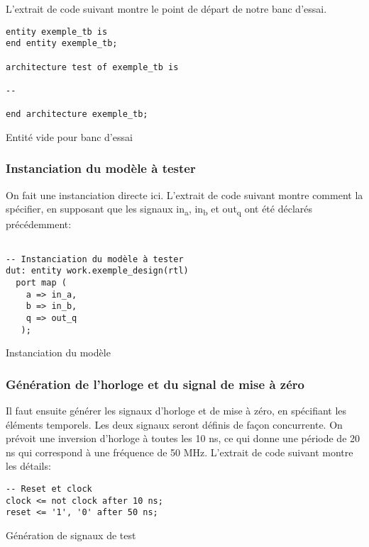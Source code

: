 \documentclass[11pt]{article}
\begin{document}
L'extrait de code suivant montre le point de départ de notre banc
d'essai.

\begin{listing}[htbp]
\begin{verbatim}
entity exemple_tb is
end entity exemple_tb;

architecture test of exemple_tb is

--

end architecture exemple_tb;
\end{verbatim}
\caption{Entité vide pour banc d'essai}
\end{listing}

\subsubsection{Instanciation du modèle à tester}
\label{sec:org7532ff5}

On fait une instanciation directe ici. L'extrait de code suivant
montre comment la spécifier, en supposant que les signaux in\textsubscript{a}, in\textsubscript{b}
et out\textsubscript{q} ont été déclarés précédemment:

\begin{listing}[htbp]
\begin{verbatim}

-- Instanciation du modèle à tester 
dut: entity work.exemple_design(rtl)
  port map (
    a => in_a,
    b => in_b,
    q => out_q
   );

\end{verbatim}
\caption{Instanciation du modèle}
\end{listing}

\subsubsection{Génération de l'horloge et du signal de mise à zéro}
\label{sec:orgca83bb9}

Il faut ensuite générer les signaux d'horloge et de mise à zéro, en
spécifiant les éléments temporels. Les deux signaux seront définis de
façon concurrente. On prévoit une inversion d'horloge à toutes les 10
ns, ce qui donne une période de 20 ns qui correspond à une fréquence
de 50 MHz. L'extrait de code suivant montre les détails:

\begin{listing}[htbp]
\begin{verbatim}
-- Reset et clock
clock <= not clock after 10 ns;
reset <= '1', '0' after 50 ns;
\end{verbatim}
\caption{Génération de signaux de test}
\end{listing}
\end{document}
